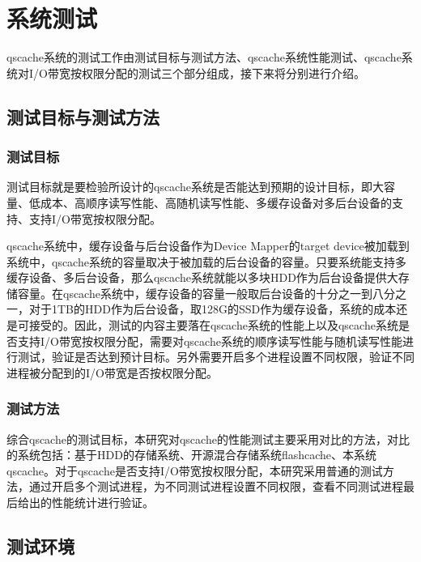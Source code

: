 
\chapter{系统测试}
\label{chap:sys_test}

qscache系统的测试工作由测试目标与测试方法、qscache系统性能测试、qscache系统对I/O带宽按权限分配的测试三个部分组成，接下来将分别进行介绍。

\section{测试目标与测试方法}

\subsection{测试目标}

测试目标就是要检验所设计的qscache系统是否能达到预期的设计目标，即大容量、低成本、高顺序读写性能、高随机读写性能、多缓存设备对多后台设备的支持、支持I/O带宽按权限分配。

qscache系统中，缓存设备与后台设备作为Device Mapper的target device被加载到系统中，qscache系统的容量取决于被加载的后台设备的容量。只要系统能支持多缓存设备、多后台设备，那么qscache系统就能以多块HDD作为后台设备提供大存储容量。在qscache系统中，缓存设备的容量一般取后台设备的十分之一到八分之一，对于1TB的HDD作为后台设备，取128G的SSD作为缓存设备，系统的成本还是可接受的。因此，测试的内容主要落在qscache系统的性能上以及qscache系统是否支持I/O带宽按权限分配，需要对qscache系统的顺序读写性能与随机读写性能进行测试，验证是否达到预计目标。另外需要开启多个进程设置不同权限，验证不同进程被分配到的I/O带宽是否按权限分配。

\subsection{测试方法}

综合qscache的测试目标，本研究对qscache的性能测试主要采用对比的方法，对比的系统包括：基于HDD的存储系统、开源混合存储系统flashcache、本系统qscache。对于qscache是否支持I/O带宽按权限分配，本研究采用普通的测试方法，通过开启多个测试进程，为不同测试进程设置不同权限，查看不同测试进程最后给出的性能统计进行验证。

\section{测试环境}

